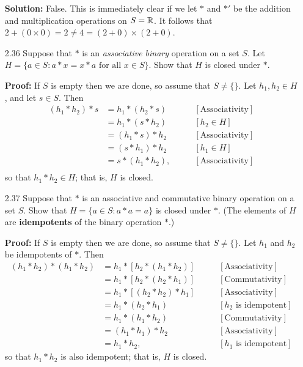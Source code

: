 \begin{enumerate}
      \textbf{Solution:} False. This is immediately clear if we let $*$ and $*'$
      be the addition and multiplication operations on $S = \mathbb{R}$. It follows that
      $2 + (0 \times 0) = 2 \neq 4 = (2 + 0) \times (2 + 0)$.
   \item[2.36] Suppose that $*$ is an \textit{associative binary} operation on
               a set $S$. Let
               $H = \{a \in S : a * x = x * a \mbox{ for all } x \in S\}$. Show
               that $H$ is closed under $*$.

      \textbf{Proof:} If $S$ is empty then we are done, so assume that
      $S \neq \{\}$. Let $h_1, h_2 \in H$, and let $s \in S$. Then
      \begin{align*}
         (h_1 * h_2) * s &= h_1 * (h_2 * s) &\qquad[\text{Associativity}] \\
            &= h_1 * (s * h_2) &\qquad [h_2 \in H] \\
            &= (h_1 * s) * h_2 &\qquad [\text{Associativity}] \\
            &= (s * h_1) * h_2 &\qquad [h_1 \in H] \\
            &= s * (h_1 * h_2), &\qquad [\text{Associativity}] \\
      \end{align*}
      so that $h_1 * h_2 \in H$; that is, $H$ is closed.
   \item[2.37] Suppose that $*$ is an associative and commutative binary
               operation on a set $S$. Show that $H = \{a \in S : a * a = a\}$
               is closed under $*$. (The elements of $H$ are
               \textbf{idempotents} of the binary operation $*$.)

      \textbf{Proof:} If $S$ is empty then we are done, so assume that
      $S \neq \{\}$. Let $h_1$ and $h_2$ be idempotents of $*$. Then
      \begin{align*}
         (h_1 * h_2) * (h_1 * h_2) &= h_1 * [h_2 * (h_1 * h_2)]
            &\qquad[\text{Associativity}] \\
            &= h_1 * [h_2 * (h_2 * h_1)] &\qquad[\text{Commutativity}] \\
            &= h_1 * [(h_2 * h_2) * h_1] &\qquad[\text{Associativity}] \\
            &= h_1 * (h_2 * h_1) &\qquad[h_2 \text{ is idempotent}] \\
            &= h_1 * (h_1 * h_2) &\qquad[\text{Commutativity}] \\
            &= (h_1 * h_1) * h_2 &\qquad[\text{Associativity}] \\
            &= h_1 * h_2, &\qquad[h_1 \text{ is idempotent}]
      \end{align*}
      so that $h_1 * h_2$ is also idempotent; that is, $H$ is closed.
\end{enumerate}
